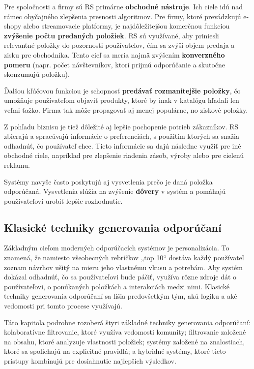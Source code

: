 Pre spoločnosti a firmy sú RS primárne \textbf{obchodné nástroje}. Ich ciele idú nad rámec obyčajného zlepšenia presnosti algoritmov. Pre firmy, ktoré prevádzkujú e-shopy alebo streamovacie platformy, je najdôležitejšou komerčnou funkciou \textbf{zvýšenie počtu predaných položiek}. RS sú využívané, aby priniesli relevantné položky do pozornosti používateľov, čím sa zvýši objem predaja a zisku pre obchodníka. Tento cieľ sa meria najmä zvýšením \textbf{konverzného pomeru} (napr. počet návštevníkov, ktorí prijmú odporúčanie a skutočne skonzumujú položku). \cite{Ricci, Aggarwal}

Ďalšou kľúčovou funkciou je schopnosť \textbf{predávať rozmanitejšie položky}, čo umožňuje používateľom objaviť produkty, ktoré by inak v katalógu hľadali len veľmi ťažko. Firma tak môže propagovať aj menej populárne, no ziskové položky. \cite{Ricci}

Z pohľadu biznisu je tiež dôležité aj lepšie pochopenie potrieb zákazníkov. RS zbierajú a spracúvajú informácie o preferenciách, s použitím ktorých sa snažia odhadnúť, čo používateľ chce. Tieto informácie sa dajú následne využiť pre iné obchodné ciele, napríklad pre zlepšenie riadenia zásob, výroby alebo pre cielenú reklamu. \cite{Aggarwal, Ricci}

Systémy navyše často poskytujú aj vysvetlenia prečo je daná položka odporúčaná. Vysvetlenia slúžia na zvýšenie \textbf{dôvery} v systém a pomáhajú používateľovi urobiť lepšie rozhodnutie. \cite{Ricci, Aggarwal}


\subsection{Klasické techniky generovania odporúčaní}

Základným cieľom moderných odporúčacích systémov je personalizácia. To znamená, že namiesto všeobecných rebríčkov „top 10“ dostáva každý používateľ zoznam návrhov ušitý na mieru jeho vlastnému vkusu a potrebám. Aby systém dokázal odhadnúť, čo sa používateľovi bude páčiť, využíva rôzne zdroje dát o používateľovi, o ponúkaných položkách a interakciách medzi nimi. Klasické techniky generovania odporúčaní sa líšia predovšetkým tým, akú logiku a aké vedomosti pri tomto procese využívajú.\cite{Ricci, Aggarwal}

Táto kapitola podrobne rozoberá štyri základné techniky generovania odporúčaní: kolaboratívne filtrovanie, ktoré využíva vedomosti komunity; filtrovanie založené na obsahu, ktoré analyzuje vlastnosti položiek; systémy založené na znalostiach, ktoré sa spoliehajú na explicitné pravidlá; a hybridné systémy, ktoré tieto prístupy kombinujú pre dosiahnutie najlepších výsledkov.


